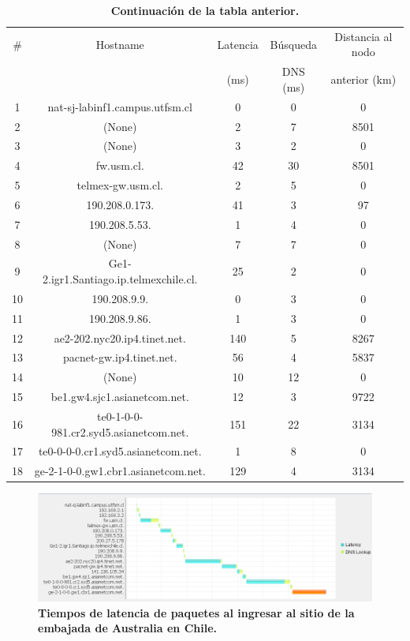 \documentclass[12pt]{article}
\begin{document}
\begin{table}[H]
\centering
\begin{tabular}{| c | c | c | c | c |}
\hline
\# & Hostname & Latencia & Búsqueda & Distancia al nodo\\
 &  & (ms) & DNS (ms) & anterior (km)\\
\hline
1 & nat-sj-labinf1.campus.utfsm.cl & 0 & 0 & 0\\
\hline
2 & (None) & 2 & 7 & 8501\\
\hline
3 & (None) & 3 & 2 & 0\\
\hline
4 & fw.usm.cl. & 42 & 30 & 8501\\
\hline
5 & telmex-gw.usm.cl. & 2 & 5 & 0\\
\hline
6 & 190.208.0.173. & 41 & 3 & 97\\
\hline
7 & 190.208.5.53. & 1 & 4 & 0\\
\hline
8 & (None) & 7 & 7 & 0\\
\hline
9 & Ge1-2.igr1.Santiago.ip.telmexchile.cl. & 25 & 2 & 0\\
\hline
10 & 190.208.9.9. & 0 & 3 & 0\\
\hline
11 & 190.208.9.86. & 1 & 3 & 0\\
\hline
12 & ae2-202.nyc20.ip4.tinet.net. & 140 & 5 & 8267\\
\hline
13 & pacnet-gw.ip4.tinet.net. & 56 & 4 & 5837\\
\hline
14 & (None) & 10 & 12 & 0\\
\hline
15 & be1.gw4.sjc1.asianetcom.net. & 12 & 3 & 9722\\
\hline
16 & te0-1-0-0-981.cr2.syd5.asianetcom.net. & 151 & 22 & 3134\\
\hline
17 & te0-0-0-0.cr1.syd5.asianetcom.net. & 1 & 8 & 0\\
\hline
18 & ge-2-1-0-0.gw1.cbr1.asianetcom.net. & 129 & 4 & 3134\\
\hline
\end{tabular}
\caption{\small \textbf{Continuación de la tabla anterior.}}
\end{table}

\begin{figure}[H] 
\centering 
\includegraphics[width=1\textwidth]{imagenes/australia_grafica_sinfin.png} \caption{\small \textbf{Tiempos de latencia de paquetes al ingresar al sitio de la embajada de Australia en Chile.}}
\label{fig:diagrama_5} 
\end{figure}
\end{document}
